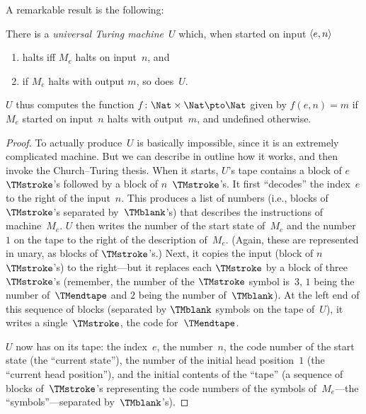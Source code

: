 \documentclass[../../../include/open-logic-section]{subfiles}
\begin{document}
A remarkable result is the following:

\begin{thm} There is a \emph{universal
  Turing machine}~$U$ which, when started on input $\langle e,n \rangle$ 
  \begin{enumerate}
    \item halts iff $M_e$ halts on input~$n$, and
    \item if $M_e$ halts with output $m$, so does~$U$.
  \end{enumerate}
  $U$ thus computes the function $f\colon \Nat \times \Nat \pto \Nat$
  given by $f(e,n) = m$ if $M_e$ started on input~$n$ halts with
  output~$m$, and undefined otherwise.
\end{thm}

\begin{proof}
  To actually produce~$U$ is basically impossible, since it is an
  extremely complicated machine. But we can describe in outline how it
  works, and then invoke the Church--Turing thesis.  When it starts,
  $U$'s tape contains a block of $e$ $\TMstroke$'s followed by a block
  of $n$~$\TMstroke$'s. It first ``decodes'' the index~$e$ to the
  right of the input~$n$. This produces a list of numbers (i.e.,
  blocks of $\TMstroke$'s separated by~$\TMblank$'s) that describes
  the instructions of machine~$M_e$. $U$ then writes the number of the
  start state of~$M_e$ and the number~$1$ on the tape to the right of
  the description of~$M_e$. (Again, these are represented in unary, as
  blocks of $\TMstroke$'s.) Next, it copies the input (block of
  $n$~$\TMstroke$'s) to the right---but it replaces each $\TMstroke$
  by a block of three $\TMstroke$'s (remember, the number of the $\TMstroke$
  symbol is~$3$, $1$ being the number of~$\TMendtape$ and $2$ being
  the number of~$\TMblank$). At the left end of this sequence of blocks
  (separated by $\TMblank$ symbols on the tape of~$U$), it writes a
  single~$\TMstroke$, the code for~$\TMendtape$.

  $U$ now has on its tape: the index~$e$, the number~$n$, the code
  number of the start state (the ``current state''), the number of the
  initial head position~$1$ (the ``current head position''), and the
  initial contents of the ``tape'' (a sequence of blocks
  of~$\TMstroke$'s representing the code numbers of the symbols
  of~$M_e$---the ``symbols''---separated by~$\TMblank$'s).


\end{proof}
\end{document}
